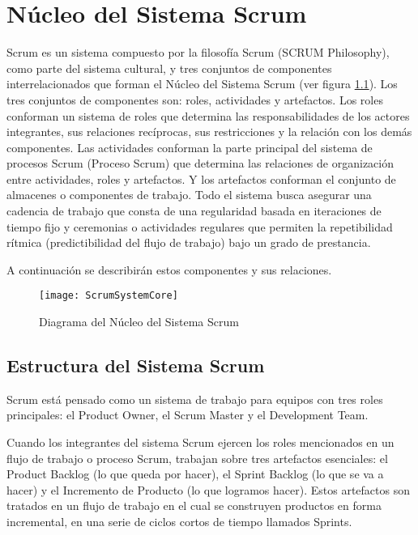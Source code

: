 
\chapter{Núcleo del Sistema Scrum}

Scrum es un sistema compuesto por la filosofía Scrum (SCRUM Philosophy), como parte del sistema cultural, y tres conjuntos de componentes interrelacionados que forman el Núcleo del Sistema Scrum (ver figura \ref{fig:ScrumSystemCore}). Los tres conjuntos de componentes son: roles, actividades y artefactos. Los roles conforman un sistema de roles que determina las responsabilidades de los actores integrantes, sus relaciones recíprocas, sus restricciones y la relación con los demás componentes. Las actividades conforman la parte principal del sistema de procesos Scrum (Proceso Scrum) que determina las relaciones de organización entre actividades, roles y artefactos. Y los artefactos conforman el conjunto de almacenes o componentes de trabajo. Todo el sistema busca asegurar una cadencia de trabajo que consta de una regularidad basada en iteraciones de tiempo fijo y ceremonias o actividades regulares que permiten la repetibilidad rítmica (predictibilidad del flujo de trabajo) bajo un grado de prestancia.

A continuación se describirán estos componentes y sus relaciones.

\begin{figure}[h]
  \centering
  \texttt{[image: ScrumSystemCore]}
  \caption{Diagrama del Núcleo del Sistema Scrum}
  \centering
  \label{fig:ScrumSystemCore} %
\end{figure}


\section{Estructura del Sistema Scrum}

Scrum está pensado como un sistema de trabajo para equipos con tres roles principales: el Product Owner, el Scrum Master y el Development Team. 

Cuando los integrantes del sistema Scrum ejercen los roles mencionados en un flujo de trabajo o proceso Scrum, trabajan sobre tres artefactos esenciales: el Product Backlog (lo que queda por hacer), el Sprint Backlog (lo que se va a hacer) y el Incremento de Producto (lo que logramos hacer). Estos artefactos son tratados en un flujo de trabajo en el cual se construyen productos en forma incremental, en una serie de ciclos cortos de tiempo llamados Sprints. 


